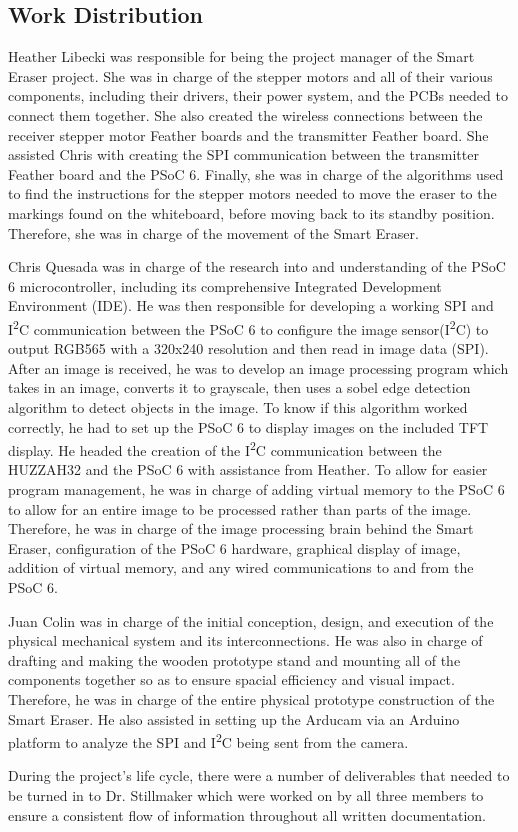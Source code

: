 \subsection{Work Distribution}
\setlength{\parindent}{2.5ex} Heather Libecki was responsible for being the project manager of the Smart Eraser project. She was in charge of the stepper motors and all of their various components, including their drivers, their power system, and the PCBs needed to connect them together. She also created the wireless connections between the receiver stepper motor Feather boards and the transmitter Feather board. She assisted Chris with creating the SPI communication between the transmitter Feather board and the PSoC 6. Finally, she was in charge of the algorithms used to find the instructions for the stepper motors needed to move the eraser to the markings found on the whiteboard, before moving back to its standby position. Therefore, she was in charge of the movement of the Smart Eraser. \par
\setlength{\parindent}{2.5ex} Chris Quesada was in charge of the research into and understanding of the PSoC 6 microcontroller, including its comprehensive Integrated Development Environment (IDE). He was then responsible for developing a working SPI and I\textsuperscript{2}C communication between the PSoC 6 to configure the image sensor(I\textsuperscript{2}C) to output RGB565 with a 320x240 resolution and then read in image data (SPI). After an image is received, he was to develop an image processing program which takes in an image, converts it to grayscale, then uses a sobel edge detection algorithm to detect objects in the image. To know if this algorithm worked correctly, he had to set up the PSoC 6 to display images on the included TFT display. He headed the creation of the I\textsuperscript{2}C communication between the HUZZAH32 and the PSoC 6 with assistance from Heather. To allow for easier program management, he was in charge of adding virtual memory to the PSoC 6 to allow for an entire image to be processed rather than parts of the image. Therefore, he was in charge of the image processing brain behind the Smart Eraser, configuration of the PSoC 6 hardware, graphical display of image, addition of virtual memory, and any wired communications to and from the PSoC 6.
 \par
\setlength{\parindent}{2.5ex} Juan Colin was in charge of the initial conception, design, and execution of the physical mechanical system and its interconnections. He was also in charge of drafting and making the wooden prototype stand and mounting all of the components together so as to ensure spacial efficiency and visual impact. Therefore, he was in charge of the entire physical prototype construction of the Smart Eraser. He also assisted in setting up the Arducam via an Arduino platform to analyze the SPI and I\textsuperscript{2}C being sent from the camera.
 \par
\setlength{\parindent}{2.5ex} During the project's life cycle, there were a number of deliverables that needed to be turned in to Dr. Stillmaker which were worked on by all three members to ensure a consistent flow of information throughout all written documentation.

